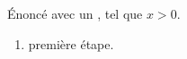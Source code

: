 \begin{theorem}[title=Convergence dominée, label=thm:tcd]
  Énoncé avec un , tel que $x > 0$.
\end{theorem}
\begin{enumerate}
  \item première étape.
\end{enumerate}
